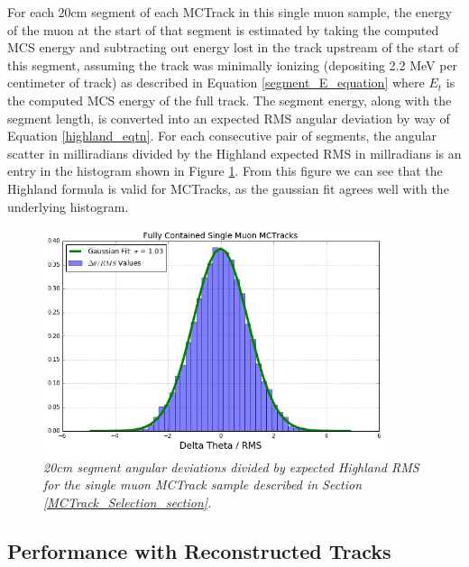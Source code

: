 For each 20cm segment of each {\sc MCTrack} in this single muon sample, the energy of the muon at the start of that segment is estimated by taking the computed MCS energy and subtracting out energy lost in the track upstream of the start of this segment, assuming the track was minimally ionizing (depositing 2.2 MeV per centimeter of track) as described in Equation \ref{segment_E_equation} where $E_t$ is the computed MCS energy of the full track. The segment energy, along with the segment length, is converted into an expected RMS angular deviation by way of Equation \ref{highland_eqtn}. For each consecutive pair of segments, the angular scatter in milliradians divided by the Highland expected RMS in millradians is an entry in the histogram shown in Figure \ref{Highland_validation_MCTracks_fig}. From this figure we can see that the Highland formula is valid for {\sc MCTracks}, as the gaussian fit agrees well with the underlying histogram.

\begin{figure}[h!]
\begin{center}
\includegraphics[width=100mm]{Figures/Highland_validation_MCTracks.png}
\end{center}
\caption{\textit{20cm segment angular deviations divided by expected Highland RMS for the single muon {\sc MCTrack} sample described in Section \ref{MCTrack_Selection_section}.}}
\label{Highland_validation_MCTracks_fig}
\end{figure}














\subsection{Performance with Reconstructed Tracks}
